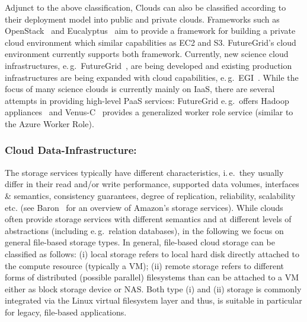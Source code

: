 \documentclass[times]{cpeauth}
\newcommand{\alnote}[1]{ {\textcolor{green} { ***andreL: #1 }}}
\newcommand{\alnote}[1]{}
\begin{document}
% 



Adjunct to the above classification, Clouds can also be classified
according to their deployment model into public and private
clouds. Frameworks such as OpenStack~\cite{openstack} and
Eucalyptus~\cite{euca} aim to provide a framework for building a
private cloud environment which similar capabilities as EC2 and
S3. FutureGrid's cloud environment currently supports both
framework. Currently, new science cloud infrastructures, e.\,g.\
FutureGrid~\cite{futuregrid}, are being developed and existing
production infrastructures are being expanded with cloud capabilities,
e.\,g.\ EGI~\cite{egi-cloud}. While the focus of many science clouds
is currently mainly on IaaS, there are several attempts in providing
high-level PaaS services: FutureGrid e.\,g.\ offers Hadoop
appliances~\cite{2016793} and Venus-C~\cite{venusc-generic-worker}
provides a generalized worker role service (similar to the Azure
Worker Role).



\subsubsection*{Cloud Data-Infrastructure: }
The storage services typically have different characteristics, i.\,e.\
they usually differ in their read and/or write performance, supported
data volumes, interfaces \& semantics, consistency guarantees, degree
of replication, reliability, scalability etc.
(see Baron~\cite{baron2010} for an overview of Amazon's storage
services). While clouds often provide storage services with different
semantics and at different levels of abstractions (including
e.\,g.\ relation databases), in the following we focus on general
file-based storage types. In general, file-based cloud storage can be
classified as follows: (i) local storage refers to local hard disk
directly attached to the compute resource (typically a VM); (ii)
remote storage refers to different forms of distributed (possible
parallel) filesystems than can be attached to a VM either as block
storage device or NAS. Both type (i) and (ii) storage is commonly
integrated via the Linux virtual filesystem layer and thus, is
suitable in particular for legacy, file-based applications.
\end{document}
